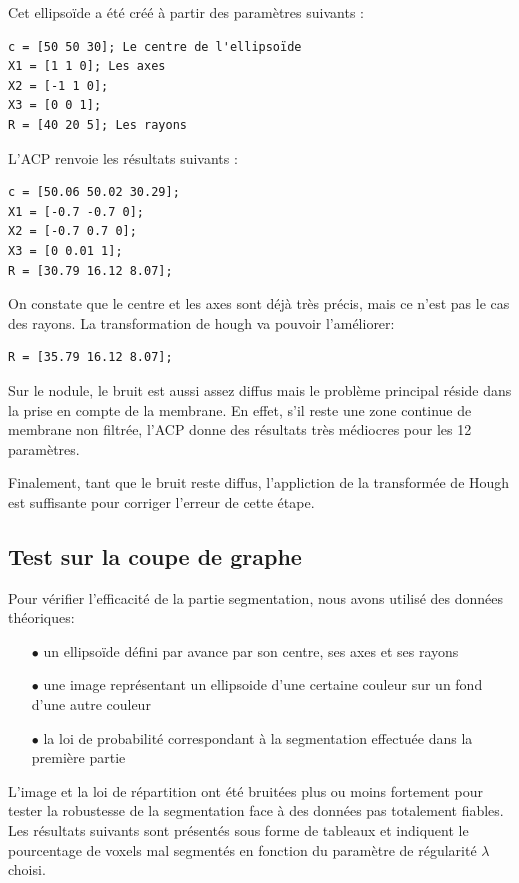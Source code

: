 \documentclass{article}
\begin{document}
Cet ellipsoïde a été créé à partir des paramètres suivants :
\begin{verbatim}
c = [50 50 30]; Le centre de l'ellipsoïde
X1 = [1 1 0]; Les axes
X2 = [-1 1 0];
X3 = [0 0 1];
R = [40 20 5]; Les rayons
\end{verbatim}

L'ACP renvoie les résultats suivants :
\begin{verbatim}
c = [50.06 50.02 30.29]; 
X1 = [-0.7 -0.7 0]; 
X2 = [-0.7 0.7 0];
X3 = [0 0.01 1];
R = [30.79 16.12 8.07]; 
\end{verbatim}
On constate que le centre et les axes sont déjà très précis, mais ce n'est pas le cas des rayons. La transformation de hough va pouvoir l'améliorer:
\begin{verbatim}
R = [35.79 16.12 8.07]; 
\end{verbatim}

Sur le nodule, le bruit est aussi assez diffus mais le problème principal réside dans la prise en compte de la membrane. En effet, s'il reste une zone continue de membrane non filtrée, l'ACP donne des résultats très médiocres pour les 12 paramètres.

Finalement, tant que le bruit reste diffus, l'appliction de la transformée de Hough est suffisante pour corriger l'erreur de cette étape.

\subsection{Test sur la coupe de graphe}
Pour vérifier l'efficacité de la partie segmentation, nous avons utilisé des données théoriques:
\begin{itemize}
	\item[$\bullet$] un ellipsoïde défini par avance par son centre, ses axes et ses rayons
	\item[$\bullet$] une image représentant un ellipsoide d'une certaine couleur sur un fond d'une autre couleur
	\item[$\bullet$] la loi de probabilité correspondant à la segmentation effectuée dans la première partie
\end{itemize} 
L'image et la loi de répartition ont été bruitées plus ou moins fortement pour tester la robustesse de la segmentation face à des données pas totalement fiables.\\
Les résultats suivants sont présentés sous forme de tableaux et indiquent le pourcentage de voxels mal segmentés en fonction du paramètre de régularité $\lambda$ choisi.
\end{document}
